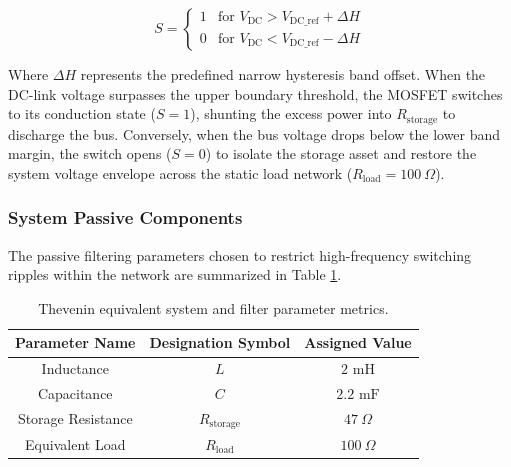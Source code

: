 \begin{equation}
    S = 
    \begin{cases} 
      1 & \text{for } V_{\text{DC}} > V_{\text{DC\_ref}} + \Delta H \\
      0 & \text{for } V_{\text{DC}} < V_{\text{DC\_ref}} - \Delta H 
    \end{cases}
\end{equation}

Where $\Delta H$ represents the predefined narrow hysteresis band offset. When the DC-link voltage surpasses the upper boundary threshold, the MOSFET switches to its conduction state ($S=1$), shunting the excess power into $R_{\text{storage}}$ to discharge the bus. Conversely, when the bus voltage drops below the lower band margin, the switch opens ($S=0$) to isolate the storage asset and restore the system voltage envelope across the static load network ($R_{\text{load}} = 100\ \Omega$).

\subsubsection{System Passive Components}
The passive filtering parameters chosen to restrict high-frequency switching ripples within the network are summarized in Table \ref{tab:thevenin_parameters}.

\begin{table}[htbp]
    \centering
    \caption{Thevenin equivalent system and filter parameter metrics.}
    \label{tab:thevenin_parameters}
    \small
    \begin{tabular}{|c|c|c|}
        \hline
        \textbf{Parameter Name} & \textbf{Designation Symbol} & \textbf{Assigned Value} \\ \hline
        Inductance       & $L$                        & $2\text{ mH}$           \\ \hline
        Capacitance      & $C$                        & $2.2\text{ mF}$         \\ \hline
        Storage Resistance      & $R_{\text{storage}}$       & $47\ \Omega$            \\ \hline
        Equivalent Load         & $R_{\text{load}}$          & $100\ \Omega$           \\ \hline
    \end{tabular}
\end{table}

